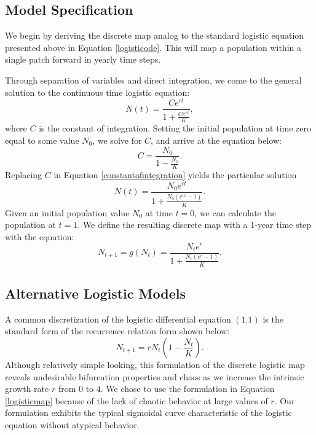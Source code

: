 \documentclass[12pt, openany]{book}
\theoremstyle{definition}
\theoremstyle{remark}
\numberwithin{equation}{chapter}
\numberwithin{figure}{chapter}
\begin{document}
\subsection{Model Specification}

We begin by deriving the discrete map analog to the standard logistic equation presented above in Equation \ref{logisticode}. This will map a population within a single patch forward in yearly time steps.

Through separation of variables and direct integration, we come to the general solution to the continuous time logistic equation:
\begin{equation}\label{generalsolution}
N(t) = \frac{Ce^{rt}}{1 + \frac{Ce^{rt}}{K}},
\end{equation}
where $C$ is the constant of integration. Setting the initial population at time zero equal to some value $N_0$, we solve for $C$, and arrive at the equation below:
\begin{equation}\label{constantofintegration}
C = \frac{N_0}{1-\frac{N_0}{K}}.
\end{equation}
Replacing $C$ in Equation \ref{constantofintegration} yields the particular solution
\begin{equation}\label{particularsolution}
N(t) = \frac{N_{0}e^{rt}}{1 + \frac{N_{0}(e^{rt}-1)}{K}}.
\end{equation}
Given an initial population value $N_0$ at time $t = 0$, we can calculate the population at $t = 1$. We define the resulting discrete map with a 1-year time step with the equation:
\begin{equation}\label{logisticmap}
N_{t+1} = g(N_t) = \frac{N_{t}e^{r}}{1 + \frac{N_{t}(e^{r}-1)}{K}}.
\end{equation}
\subsection{Alternative Logistic Models}

	A common discretization of the logistic differential equation $(1.1)$ is the standard form of the recurrence relation form shown below:
\begin{equation}\label{altlog}
N_{t+1} = rN_t\left(1 - \frac{N_t}{K}\right).
\end{equation}
Although relatively simple looking, this formulation of the discrete logistic map reveals undesirable bifurcation properties and chaos as we increase the intrinsic growth rate $r$ from $0$ to $4$.	
	We chose to use the formulation in Equation \ref{logisticmap} because of the lack of chaotic behavior at large values of $r$. Our formulation exhibits the typical sigmoidal curve characteristic of the logistic equation without atypical behavior.
\end{document}
